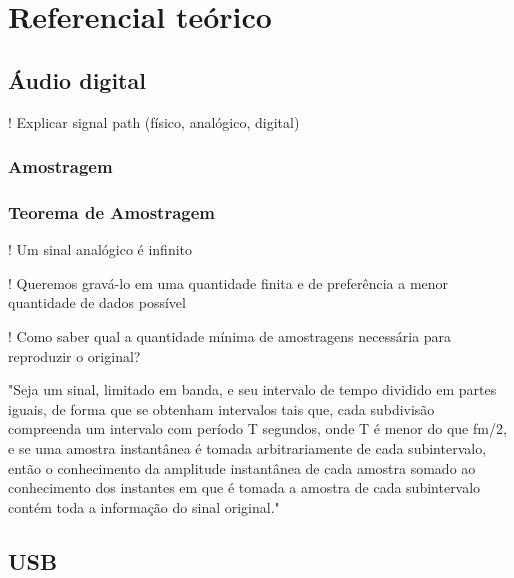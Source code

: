 
\chapter{Referencial teórico}\label{cap:referencialTeorico}

\section{Áudio digital}
! Explicar signal path (físico, analógico, digital)


\subsection{Amostragem}
\subsection{Teorema de Amostragem}
! Um sinal analógico é infinito

! Queremos gravá-lo em uma quantidade finita e de preferência a menor quantidade de dados possível

! Como saber qual a quantidade mínima de amostragens necessária para reproduzir o original?

\begin{displayquote}
"Seja um sinal, limitado em banda, e seu intervalo de tempo dividido em partes iguais, de forma que se obtenham intervalos tais que, cada subdivisão compreenda um intervalo com período T segundos, onde T é menor do que fm/2, e se uma amostra instantânea é tomada arbitrariamente de cada subintervalo, então o conhecimento da amplitude instantânea de cada amostra somado ao conhecimento dos instantes em que é tomada a amostra de cada subintervalo contém toda a informação do sinal original."
\end{displayquote}


\section{USB}
